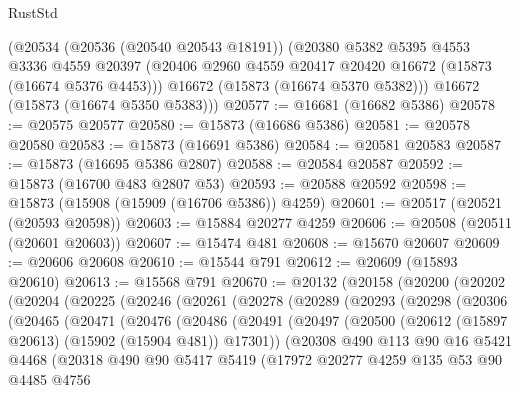 \begin{lexlean}{RustStd}
\begin{coremodule}
    (@20534
      (@20536 (@20540 @20543 @18191))
      (@20380
        @5382
        @5395
        @4553
        @3336
        @4559
        @20397
        (@20406 @2960 @4559 @20417 @20420 @16672 (@15873 (@16674 @5376 @4453)))
        @16672
        (@15873 (@16674 @5370 @5382)))
      @16672
      (@15873 (@16674 @5350 @5383)))
@20577 := @16681 (@16682 @5386)
@20578 := @20575 @20577
@20580 := @15873 (@16686 @5386)
@20581 := @20578 @20580
@20583 := @15873 (@16691 @5386)
@20584 := @20581 @20583
@20587 := @15873 (@16695 @5386 @2807)
@20588 := @20584 @20587
@20592 := @15873 (@16700 @483 @2807 @53)
@20593 := @20588 @20592
@20598 := @15873 (@15908 (@15909 (@16706 @5386)) @4259)
@20601 := @20517 (@20521 (@20593 @20598))
@20603 := @15884 @20277 @4259
@20606 := @20508 (@20511 (@20601 @20603))
@20607 := @15474 @481
@20608 := @15670 @20607
@20609 := @20606 @20608
@20610 := @15544 @791
@20612 := @20609 (@15893 @20610)
@20613 := @15568 @791
@20670 := @20132
    (@20158
      (@20200
        (@20202
          (@20204
            (@20225
              (@20246
                (@20261
                  (@20278
                    (@20289
                      (@20293
                        (@20298
                          (@20306
                            (@20465
                              (@20471
                                (@20476
                                  (@20486
                                    (@20491
                                      (@20497
                                        (@20500
                                          (@20612 (@15897 @20613) (@15902 (@15904 @481)) @17301))
                                        (@20308
                                          @490
                                          @113
                                          @90
                                          @16
                                          @5421
                                          @4468
                                          (@20318
                                            @490
                                            @90
                                            @5417
                                            @5419
                                            (@17972
                                              @20277
                                              @4259
                                              @135
                                              @53
                                              @90
                                              @4485
                                              @4756

\end{coremodule}
\end{lexlean}
